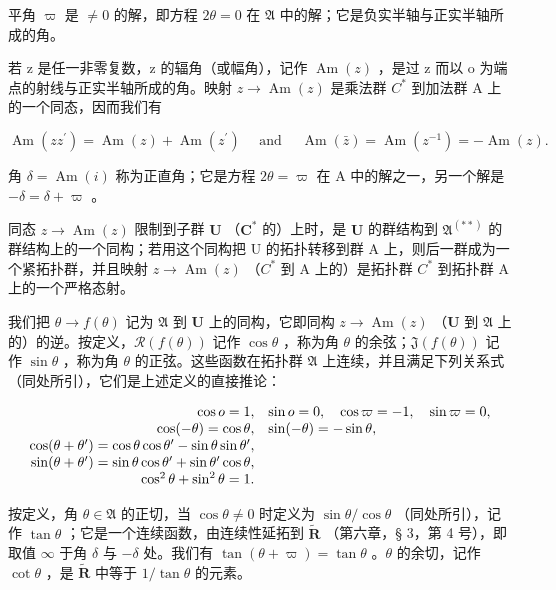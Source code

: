 平角 \(\varpi\) 是 \(\neq 0\) 的解，即方程 \(2\theta = 0\) 在 \(\mathfrak{A}\) 中的解；它是负实半轴与正实半轴所成的角。

若 z 是任一非零复数，z 的辐角（或幅角），记作 \(\operatorname{Am}(z)\) ，是过 z 而以 o 为端点的射线与正实半轴所成的角。映射 \(z \to \operatorname{Am}(z)\) 是乘法群 \(C^{*}\) 到加法群 A 上的一个同态，因而我们有

\[
\operatorname{Am} \left(z z ^ {\prime}\right) = \operatorname{Am} (z) + \operatorname{Am} \left(z ^ {\prime}\right) \quad \text { and } \quad \operatorname{Am} (\bar {z}) = \operatorname{Am} \left(z ^ {- 1}\right) = - \operatorname{Am} (z).
\]

角 \(\delta = \operatorname{Am}(i)\) 称为正直角；它是方程 \(2\theta = \varpi\) 在 A 中的解之一，另一个解是 \(-\delta = \delta + \varpi\) 。

同态 \(z \to \operatorname{Am}(z)\) 限制到子群 \(\mathbf{U}\) （\(\mathbf{C}^*\) 的）上时，是 \(\mathbf{U}\) 的群结构到 \(\mathfrak{A}^{(**)}\) 的群结构上的一个同构；若用这个同构把 U 的拓扑转移到群 A 上，则后一群成为一个紧拓扑群，并且映射 \(z \to \operatorname{Am}(z)\) （\(C^{*}\) 到 A 上的）是拓扑群 \(C^{*}\) 到拓扑群 A 上的一个严格态射。

我们把 \(\theta \to f(\theta)\) 记为 \(\mathfrak{A}\) 到 \(\mathbf{U}\) 上的同构，它即同构 \(z \to \operatorname{Am}(z)\) （\(\mathbf{U}\) 到 \(\mathfrak{A}\) 上的）的逆。按定义，\(\mathcal{R}(f(\theta))\) 记作 \(\cos \theta\) ，称为角 \(\theta\) 的余弦；\(\mathfrak{J}(f(\theta))\) 记作 \(\sin \theta\) ，称为角 \(\theta\) 的正弦。这些函数在拓扑群 \(\mathfrak{A}\) 上连续，并且满足下列关系式（同处所引），它们是上述定义的直接推论：

\[
\begin{array}{r l} \cos o = 1, & \sin o = 0, \quad \cos \varpi = - 1, \quad \sin \varpi = 0, \\ \cos (- \theta) = \cos \theta , & \sin (- \theta) = - \sin \theta , \\ \cos (\theta + \theta^ {\prime}) = \cos \theta \cos \theta^ {\prime} - \sin \theta \sin \theta^ {\prime}, \\ \sin (\theta + \theta^ {\prime}) = \sin \theta \cos \theta^ {\prime} + \sin \theta^ {\prime} \cos \theta , \\ \cos^ {2} \theta + \sin^ {2} \theta = 1. \end{array}
\]

按定义，角 \(\theta \in \mathfrak{A}\) 的正切，当 \(\cos \theta \neq 0\) 时定义为 \(\sin \theta / \cos \theta\) （同处所引），记作 \(\tan \theta\) ；它是一个连续函数，由连续性延拓到 \(\tilde{\mathbf{R}}\) （第六章，§ 3，第 4 号），即取值 \(\infty\) 于角 \(\delta\) 与 \(-\delta\) 处。我们有 \(\tan (\theta + \varpi) = \tan \theta\) 。\(\theta\) 的余切，记作 \(\cot \theta\) ，是 \(\tilde{\mathbf{R}}\) 中等于 \(1 / \tan \theta\) 的元素。

